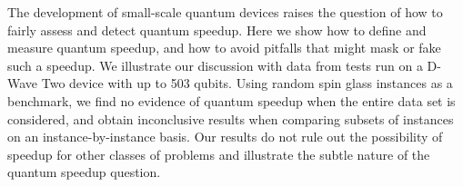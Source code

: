 



\begin{sciabstract}

The development of small-scale quantum devices raises the question of how to fairly assess and detect quantum speedup. Here we show how to define and measure quantum speedup, and how to avoid pitfalls that might mask or fake such a speedup. We illustrate our discussion with data from tests run on a D-Wave Two device with up to 503 qubits. 
Using random spin glass instances as a benchmark, we find no evidence of quantum speedup when the entire data set is considered, and obtain inconclusive results when comparing subsets of instances on an instance-by-instance basis. Our results do not rule out the possibility of speedup for other classes of problems and illustrate 
the subtle nature of the quantum speedup question.
\end{sciabstract}
